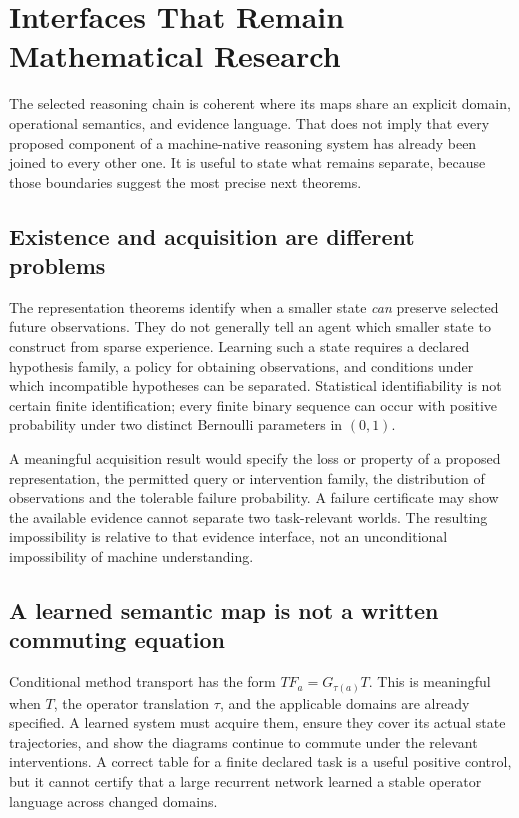 \chapter{Interfaces That Remain Mathematical Research}\label{ch:frontier}

The selected reasoning chain is coherent where its maps share an explicit domain, operational semantics, and evidence language. That does not imply that every proposed component of a machine-native reasoning system has already been joined to every other one. It is useful to state what remains separate, because those boundaries suggest the most precise next theorems.

\section{Existence and acquisition are different problems}
The representation theorems identify when a smaller state \emph{can} preserve selected future observations. They do not generally tell an agent which smaller state to construct from sparse experience. Learning such a state requires a declared hypothesis family, a policy for obtaining observations, and conditions under which incompatible hypotheses can be separated. Statistical identifiability is not certain finite identification; every finite binary sequence can occur with positive probability under two distinct Bernoulli parameters in $(0,1)$.

A meaningful acquisition result would specify the loss or property of a proposed representation, the permitted query or intervention family, the distribution of observations and the tolerable failure probability. A failure certificate may show the available evidence cannot separate two task-relevant worlds. The resulting impossibility is relative to that evidence interface, not an unconditional impossibility of machine understanding.

\section{A learned semantic map is not a written commuting equation}
Conditional method transport has the form $TF_a=G_{\tau(a)}T$. This is meaningful when $T$, the operator translation $\tau$, and the applicable domains are already specified. A learned system must acquire them, ensure they cover its actual state trajectories, and show the diagrams continue to commute under the relevant interventions. A correct table for a finite declared task is a useful positive control, but it cannot certify that a large recurrent network learned a stable operator language across changed domains.

